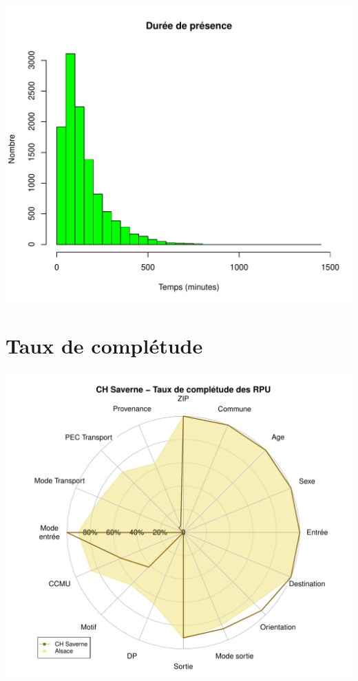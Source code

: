 \documentclass[12pt,english,french,twoside]{book}\usepackage[]{graphicx}\usepackage[]{color}
\makeatletter
\def\maxwidth{ %
  \ifdim\Gin@nat@width>\linewidth
    \linewidth
  \else
    \Gin@nat@width
  \fi
}
\newenvironment{knitrout}{}{} %
\makeatother
\begin{document}
\begin{knitrout}
\color{fgcolor}
\includegraphics[width=\maxwidth]{figure/graphe_sav-1} 

\end{knitrout}

\section*{Taux de complétude}

\begin{knitrout}
\color{fgcolor}
\includegraphics[width=\maxwidth]{figure/compl_sav-1} 

\end{knitrout}
\end{document}
